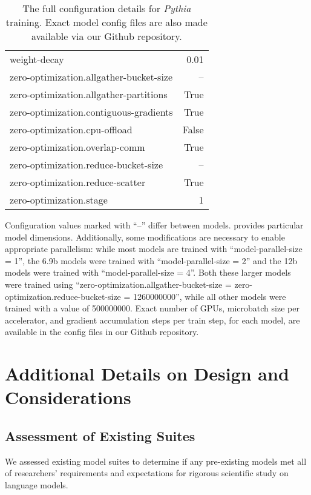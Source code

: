 \documentclass{article}
\theoremstyle{plain}
\theoremstyle{definition}
\theoremstyle{remark}
\begin{document}
\begin{table}[!ht]
\begin{subtable}[h]{0.48\textwidth}
\begin{tabular}{lr}
    weight-decay & 0.01 \\
    zero-optimization.allgather-bucket-size & -- \\
    zero-optimization.allgather-partitions & True \\
    zero-optimization.contiguous-gradients & True \\
    zero-optimization.cpu-offload & False \\
    zero-optimization.overlap-comm & True \\
    zero-optimization.reduce-bucket-size & -- \\
    zero-optimization.reduce-scatter & True \\
    zero-optimization.stage & 1 \\\bottomrule
\end{tabular}
\end{subtable}
\caption{The full configuration details for \textit{Pythia} training. Exact model config files are also made available via our Github repository.}
\label{tab:config}
\end{table}

Configuration values marked with ``--'' differ between models.  provides particular model dimensions. Additionally, some modifications are necessary to enable appropriate parallelism: while most models are trained with ``model-parallel-size = 1'', the 6.9b models were trained with ``model-parallel-size = 2'' and the 12b models were trained with ``model-parallel-size = 4''. Both these larger models were trained using ``zero-optimization.allgather-bucket-size = zero-optimization.reduce-bucket-size = 1260000000'', while all other models were trained with a value of 500000000. Exact number of GPUs, microbatch size per accelerator, and gradient accumulation steps per train step, for each model, are available in the config files in our Github repository.

\clearpage
\section{Additional Details on Design and Considerations}

\subsection{Assessment of Existing Suites}\label{app:suites}

We assessed existing model suites to determine if any pre-existing models met all of researchers' requirements and expectations for rigorous scientific study on language models. 
\end{document}
